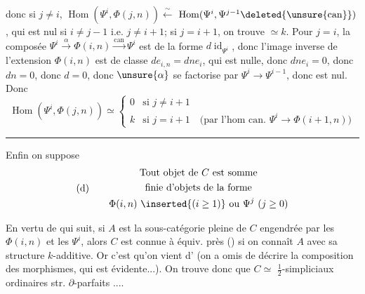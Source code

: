 \unsure{$\forall\alpha\in$}
donc si $j\neq i$, $\operatorname{Hom}(\Psi^i,\Phi(j,n))\xleftarrow{\sim}$
$\operatorname{Hom}(\Psi^i,\Psi^{j-1}\deleted{\unsure{\mathrm{can}}})$,
qui est nul si
$i\neq j-1$ i.e. $j\neq i+1$; si $j=i+1$, on trouve $\simeq k$.
Pour $j=i$, la composée
$\Psi^i\xrightarrow{\alpha}\Phi(i,n)\xrightarrow{\mathrm{can}}\Psi^i$
est de la forme
$d\operatorname{id}_{\Psi^i}$, donc l'image
inverse de l'extension
$\Phi(i,n)$ est de classe $d e_{i,n}=dn e_i$,
qui est nulle, donc $dn e_i=0$, donc
$dn=0$, donc $d=0$, donc $\unsure{\alpha}$ se factorise
par $\Psi^i\longrightarrow\Psi^{i-1}$, donc est nul.
Donc
\[
\operatorname{Hom}(\Psi^i,\Phi(j,n))\simeq
\left\{\begin{array}{ll}
0&\text{si }j\neq i+1\\
k&\text{si }j=i+1\quad\text{(par l'hom can. }\Psi^i\longrightarrow\Phi(i+1,n)\text{)}
\end{array}\right.
\]
\par\bigskip\hrule\bigskip
Enfin on suppose
\[
\text{(d)}\qquad\begin{gathered}
\text{Tout objet de }C\text{ est somme}\\
\text{finie d'objets de la forme}\\
\Phi(i,n)\ \inserted{(i\geq1)}\text{ ou }\Psi^j\ (j\geq0)
\end{gathered}
\]

En vertu de  qui suit,
si $A$ est la sous-catégorie pleine
de $C$ engendrée par les $\Phi(i,n)$
et les $\Psi^i$, alors $C$ est connue
à équiv. près ()
si on connaît $A$ avec sa structure
$k$-additive. Or c'est  qu'on vient
d' (on a omis
de décrire la composition des
morphismes, qui est évidente...).
On trouve donc que $C\simeq$
 $\frac12$-simpliciaux ordinaires
str. $\partial$-parfaits ....

